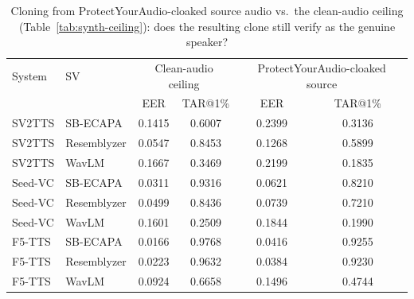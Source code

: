 \documentclass[11pt]{article}
\begin{document}
\begin{table}[H]
\centering
\caption{Cloning from ProtectYourAudio-cloaked source audio vs.\ the
clean-audio ceiling (Table~\ref{tab:synth-ceiling}): does the resulting
clone still verify as the genuine speaker?}
\label{tab:protective-efficacy-protectyouraudio}
\begin{tabular}{llcccc}
\toprule
System & SV & \multicolumn{2}{c}{Clean-audio ceiling} & \multicolumn{2}{c}{ProtectYourAudio-cloaked source} \\
       &    & EER & TAR@1\% & EER & TAR@1\% \\
\midrule
SV2TTS   & SB-ECAPA    & 0.1415 & 0.6007 & 0.2399 & 0.3136 \\
SV2TTS   & Resemblyzer & 0.0547 & 0.8453 & 0.1268 & 0.5899 \\
SV2TTS   & WavLM       & 0.1667 & 0.3469 & 0.2199 & 0.1835 \\
\addlinespace
Seed-VC  & SB-ECAPA    & 0.0311 & 0.9316 & 0.0621 & 0.8210 \\
Seed-VC  & Resemblyzer & 0.0499 & 0.8436 & 0.0739 & 0.7210 \\
Seed-VC  & WavLM       & 0.1601 & 0.2509 & 0.1844 & 0.1990 \\
\addlinespace
F5-TTS   & SB-ECAPA    & 0.0166 & 0.9768 & 0.0416 & 0.9255 \\
F5-TTS   & Resemblyzer & 0.0223 & 0.9632 & 0.0384 & 0.9230 \\
F5-TTS   & WavLM       & 0.0924 & 0.6658 & 0.1496 & 0.4744 \\
\bottomrule
\end{tabular}
\end{table}
\end{document}
